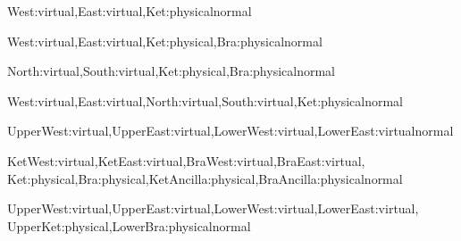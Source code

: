   {West:virtual,East:virtual,Ket:physical}{normal}
  {\begin{TNDiagram}
   \end{TNDiagram}}
  {West:virtual,East:virtual,Ket:physical,Bra:physical}{normal}
  {\begin{TNDiagram}
   \end{TNDiagram}}
  {North:virtual,South:virtual,Ket:physical,Bra:physical}{normal}
  {\begin{TNDiagram}
   \end{TNDiagram}}
  {West:virtual,East:virtual,North:virtual,South:virtual,Ket:physical}{normal}
  {\begin{TNDiagram}
   \end{TNDiagram}}
  {UpperWest:virtual,UpperEast:virtual,LowerWest:virtual,LowerEast:virtual}{normal}
  {\begin{TNDiagram}
   \end{TNDiagram}}
  {KetWest:virtual,KetEast:virtual,BraWest:virtual,BraEast:virtual,
   Ket:physical,Bra:physical,KetAncilla:physical,BraAncilla:physical}{normal}
  {\begin{TNDiagram}
   \end{TNDiagram}}
  {UpperWest:virtual,UpperEast:virtual,LowerWest:virtual,LowerEast:virtual,
   UpperKet:physical,LowerBra:physical}{normal}
  {\begin{TNDiagram}
   \end{TNDiagram}}
